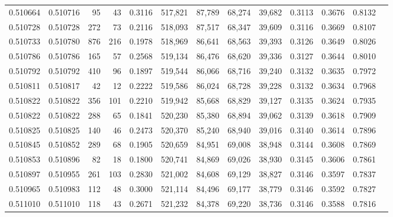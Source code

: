 \begin{tabular}{rrrrrrrrrrrrr}
0.510664 & 0.510716 &    95 &    43 &                                     0.3116 & 517,821 &  87,789 &  68,274 &  39,682 & 0.3113 & 0.3676 & 0.8132 \\
0.510728 & 0.510728 &   272 &    73 &                                     0.2116 & 518,093 &  87,517 &  68,347 &  39,609 & 0.3116 & 0.3669 & 0.8107 \\
0.510733 & 0.510780 &   876 &   216 &                                     0.1978 & 518,969 &  86,641 &  68,563 &  39,393 & 0.3126 & 0.3649 & 0.8026 \\
0.510786 & 0.510786 &   165 &    57 &                                     0.2568 & 519,134 &  86,476 &  68,620 &  39,336 & 0.3127 & 0.3644 & 0.8010 \\
0.510792 & 0.510792 &   410 &    96 &                                     0.1897 & 519,544 &  86,066 &  68,716 &  39,240 & 0.3132 & 0.3635 & 0.7972 \\
0.510811 & 0.510817 &    42 &    12 &                                     0.2222 & 519,586 &  86,024 &  68,728 &  39,228 & 0.3132 & 0.3634 & 0.7968 \\
0.510822 & 0.510822 &   356 &   101 &                                     0.2210 & 519,942 &  85,668 &  68,829 &  39,127 & 0.3135 & 0.3624 & 0.7935 \\
0.510822 & 0.510822 &   288 &    65 &                                     0.1841 & 520,230 &  85,380 &  68,894 &  39,062 & 0.3139 & 0.3618 & 0.7909 \\
0.510825 & 0.510825 &   140 &    46 &                                     0.2473 & 520,370 &  85,240 &  68,940 &  39,016 & 0.3140 & 0.3614 & 0.7896 \\
0.510845 & 0.510852 &   289 &    68 &                                     0.1905 & 520,659 &  84,951 &  69,008 &  38,948 & 0.3144 & 0.3608 & 0.7869 \\
0.510853 & 0.510896 &    82 &    18 &                                     0.1800 & 520,741 &  84,869 &  69,026 &  38,930 & 0.3145 & 0.3606 & 0.7861 \\
0.510897 & 0.510955 &   261 &   103 &                                     0.2830 & 521,002 &  84,608 &  69,129 &  38,827 & 0.3146 & 0.3597 & 0.7837 \\
0.510965 & 0.510983 &   112 &    48 &                                     0.3000 & 521,114 &  84,496 &  69,177 &  38,779 & 0.3146 & 0.3592 & 0.7827 \\
0.511010 & 0.511010 &   118 &    43 &                                     0.2671 & 521,232 &  84,378 &  69,220 &  38,736 & 0.3146 & 0.3588 & 0.7816 \\

\end{tabular}

